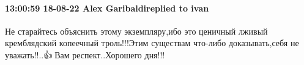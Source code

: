  
 
 
 
 

\paragraph{13:00:59 18-08-22 Alex Garibaldireplied to ivan}

Не старайтесь объяснить этому экземпляру,ибо это ценичный лживый кремблядский
копеечный троль!!!Этим существам что-либо доказывать,себя не уважать!!..👍🙏Вам
респект..Хорошего дня!!!

